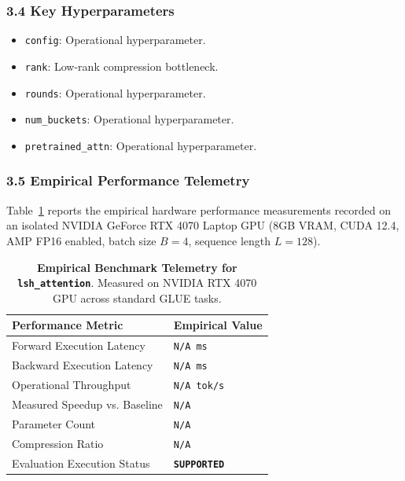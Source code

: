 \subsubsection*{3.4 Key Hyperparameters}
\begin{itemize}
    \item \texttt{config}: Operational hyperparameter.
    \item \texttt{rank}: Low-rank compression bottleneck.
    \item \texttt{rounds}: Operational hyperparameter.
    \item \texttt{num\_buckets}: Operational hyperparameter.
    \item \texttt{pretrained\_attn}: Operational hyperparameter.
\end{itemize}

\subsubsection*{3.5 Empirical Performance Telemetry}
Table~\ref{tab:telemetry_lsh\_attention} reports the empirical hardware performance measurements recorded on an isolated NVIDIA GeForce RTX 4070 Laptop GPU (8GB VRAM, CUDA 12.4, AMP FP16 enabled, batch size $B=4$, sequence length $L=128$).

\begin{table}[h]
\centering
\small
\caption{\textbf{Empirical Benchmark Telemetry for \texttt{lsh\_attention}}. Measured on NVIDIA RTX 4070 GPU across standard GLUE tasks.}
\label{tab:telemetry_lsh\_attention}
\begin{tabularx}{\columnwidth}{lX}
\toprule
\textbf{Performance Metric} & \textbf{Empirical Value} \\
\midrule
Forward Execution Latency & \texttt{N/A ms} \\
Backward Execution Latency & \texttt{N/A ms} \\
Operational Throughput & \texttt{N/A tok/s} \\
Measured Speedup vs. Baseline & \texttt{N/A} \\
Parameter Count & \texttt{N/A} \\
Compression Ratio & \texttt{N/A} \\
Evaluation Execution Status & \textbf{\texttt{SUPPORTED}} \\
\bottomrule
\end{tabularx}
\end{table}

